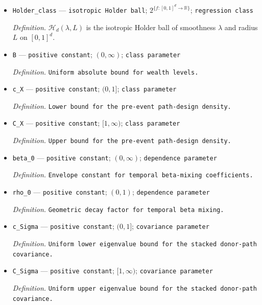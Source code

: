 \documentclass{article}
\begin{document}
\begin{itemize}
  \par\smallskip\noindent\emph{Definition.} \texttt{Common radius of the Holder regression class.}
  \item \texttt{Holder\_\allowbreak{}class} --- \texttt{isotropic Holder ball}; \(2^{\{f:[0,1]^d\to\mathbb R\}}\); \texttt{regression class}
  \par\smallskip\noindent\emph{Definition.} \(\mathcal H_d(\lambda,L)\) is the isotropic Holder ball of smoothness \(\lambda\) and radius \(L\) on \([0,1]^d\).
  \item \texttt{B} --- \texttt{positive constant}; \((0,\infty)\); \texttt{class parameter}
  \par\smallskip\noindent\emph{Definition.} \texttt{Uniform absolute bound for wealth levels.}
  \item \texttt{c\_\allowbreak{}X} --- \texttt{positive constant}; \((0,1]\); \texttt{class parameter}
  \par\smallskip\noindent\emph{Definition.} \texttt{Lower bound for the pre-\allowbreak{}event path-\allowbreak{}design density.}
  \item \texttt{C\_\allowbreak{}X} --- \texttt{positive constant}; \([1,\infty)\); \texttt{class parameter}
  \par\smallskip\noindent\emph{Definition.} \texttt{Upper bound for the pre-\allowbreak{}event path-\allowbreak{}design density.}
  \item \texttt{beta\_\allowbreak{}0} --- \texttt{positive constant}; \((0,\infty)\); \texttt{dependence parameter}
  \par\smallskip\noindent\emph{Definition.} \texttt{Envelope constant for temporal beta-\allowbreak{}mixing coefficients.}
  \item \texttt{rho\_\allowbreak{}0} --- \texttt{positive constant}; \((0,1)\); \texttt{dependence parameter}
  \par\smallskip\noindent\emph{Definition.} \texttt{Geometric decay factor for temporal beta mixing.}
  \item \texttt{c\_\allowbreak{}Sigma} --- \texttt{positive constant}; \((0,1]\); \texttt{covariance parameter}
  \par\smallskip\noindent\emph{Definition.} \texttt{Uniform lower eigenvalue bound for the stacked donor-\allowbreak{}path covariance.}
  \item \texttt{C\_\allowbreak{}Sigma} --- \texttt{positive constant}; \([1,\infty)\); \texttt{covariance parameter}
  \par\smallskip\noindent\emph{Definition.} \texttt{Uniform upper eigenvalue bound for the stacked donor-\allowbreak{}path covariance.}

\end{itemize}
\end{document}
